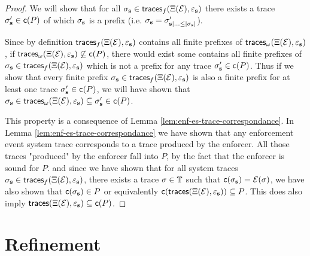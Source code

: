 \begin{proof}
    \label{proof:theorem-induced-enforcement-event-system-soundness}
    We will show that for all
    $\sigma_{\mathbf{s}} \in \mathsf{traces}_f(\Xi(\mathcal{E}), \varepsilon_{\mathbf{s}})$
    there exists a trace $\sigma_{\mathbf{s}}' \in \mathsf{c}(P)$
    of which $\sigma_{\mathbf{s}}$ is a prefix
    (i.e. $\sigma_{\mathbf{s}} = \sigma'_{\mathbf{s} \mid \ldots \leq |\sigma_{\mathbf{s}}|}$).

    Since by definition
    $\mathsf{traces}_f(\Xi(\mathcal{E}), \varepsilon_{\mathbf{s}})$
    contains all finite prefixes of
    $\mathsf{traces}_\omega(\Xi(\mathcal{E}), \varepsilon_{\mathbf{s}})$,
    if
    $\mathsf{traces}_\omega(\Xi(\mathcal{E}), \varepsilon_{\mathbf{s}})
    \not\subseteq \mathsf{c}(P)$,
    there would exist some
    contains all finite prefixes of
    $\sigma_{\mathbf{s}} \in \mathsf{traces}_f(\Xi(\mathcal{E}), \varepsilon_{\mathbf{s}})$
    which is not a prefix for any trace $\sigma_{\mathbf{s}}' \in \mathsf{c}(P)$.
    Thus if we show that every finite prefix 
    $\sigma_{\mathbf{s}} \in \mathsf{traces}_f(\Xi(\mathcal{E}), \varepsilon_{\mathbf{s}})$
    is also a finite prefix for at least one trace  $\sigma_{\mathbf{s}}' \in \mathsf{c}(P)$,
    we will have shown that
    $\sigma_{\mathbf{s}} \in \mathsf{traces}_\omega(\Xi(\mathcal{E}), \varepsilon_{\mathbf{s}})
    \subseteq \sigma_{\mathbf{s}}' \in \mathsf{c}(P)$.

    This property is a consequence of Lemma
    \ref{lem:enf-es-trace-correspondance}.
    In Lemma
    \ref{lem:enf-es-trace-correspondance}
    we have shown that any enforcement event system trace
    corresponds to a trace produced by the enforcer.
    All those traces "produced" by the enforcer fall into $P$,
    by the fact that the enforcer is sound for $P$.
    and since we have shown that for all system traces
    $\sigma_{\mathbf{s}} \in \mathsf{traces}_f(\Xi(\mathcal{E}), \varepsilon_{\mathbf{s}})$,
    there exists a trace $\sigma \in \mathbb{T}$
    such that $\mathsf{c}(\sigma_{\mathbf{s}}) = \mathcal{E}(\sigma)$, we have
    also shown that $\mathsf{c}(\sigma_{\mathbf{s}}) \in P$ or equivalently
    $\mathsf{c}(\mathsf{traces}(\Xi(\mathcal{E}), \varepsilon_{\mathbf{s}})) \subseteq P$.
    This does also imply 
    $\mathsf{traces}(\Xi(\mathcal{E}), \varepsilon_{\mathbf{s}}) \subseteq \mathsf{c}(P)$.
\end{proof}

\section{Refinement}
\label{section:refinement}


